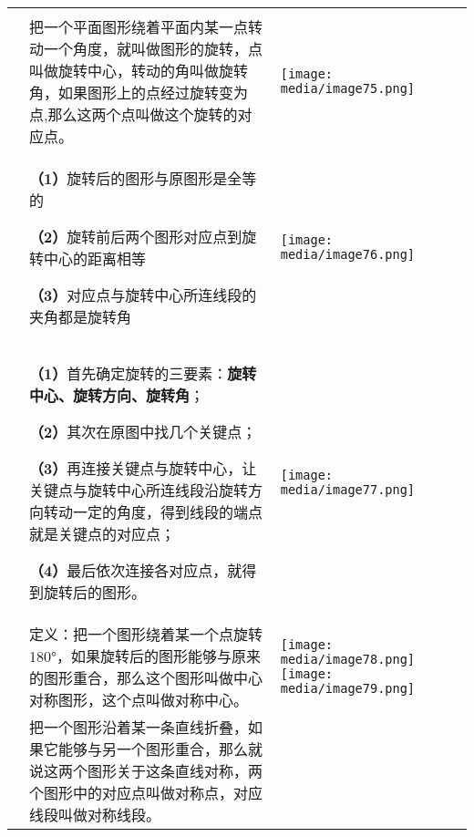 \documentclass[a4paper,11pt,UTF8]{ctexart}
\begin{document}
\begin{longtable}[]{@{}lll@{}}
\toprule
\endhead
& &\tabularnewline
&
把一个平面图形绕着平面内某一点转动一个角度，就叫做图形的旋转，点叫做旋转中心，转动的角叫做旋转角，如果图形上的点经过旋转变为点,那么这两个点叫做这个旋转的对应点。
&
\texttt{[image: media/image75.png]}\tabularnewline
\begin{minipage}[t]{0.30\columnwidth}\raggedright
\strut
\end{minipage} & \begin{minipage}[t]{0.30\columnwidth}\raggedright
\textbf{（1）}旋转后的图形与原图形是全等的

\textbf{（2）}旋转前后两个图形对应点到旋转中心的距离相等

\textbf{（3）}对应点与旋转中心所连线段的夹角都是旋转角\strut
\end{minipage} & \begin{minipage}[t]{0.30\columnwidth}\raggedright
\texttt{[image: media/image76.png]}\strut
\end{minipage}\tabularnewline
\begin{minipage}[t]{0.30\columnwidth}\raggedright
\strut
\end{minipage} & \begin{minipage}[t]{0.30\columnwidth}\raggedright
\textbf{（1）}首先确定旋转的三要素：\textbf{旋转中心、旋转方向、旋转角}；

\textbf{（2）}其次在原图中找几个关键点；

\textbf{（3）}再连接关键点与旋转中心，让关键点与旋转中心所连线段沿旋转方向转动一定的角度，得到线段的端点就是关键点的对应点；

\textbf{（4）}最后依次连接各对应点，就得到旋转后的图形。\strut
\end{minipage} & \begin{minipage}[t]{0.30\columnwidth}\raggedright
\texttt{[image: media/image77.png]}\strut
\end{minipage}\tabularnewline
&
定义：把一个图形绕着某一个点旋转180°，如果旋转后的图形能够与原来的图形重合，那么这个图形叫做中心对称图形，这个点叫做对称中心。
& \texttt{[image: media/image78.png]}
\texttt{[image: media/image79.png]}\tabularnewline
\begin{minipage}[t]{0.30\columnwidth}\raggedright
\strut
\end{minipage} & \begin{minipage}[t]{0.30\columnwidth}\raggedright
把一个图形沿着某一条直线折叠，如果它能够与另一个图形重合，那么就说这两个图形关于这条直线对称，两个图形中的对应点叫做对称点，对应线段叫做对称线段。


\end{minipage}
\end{longtable}
\end{document}
